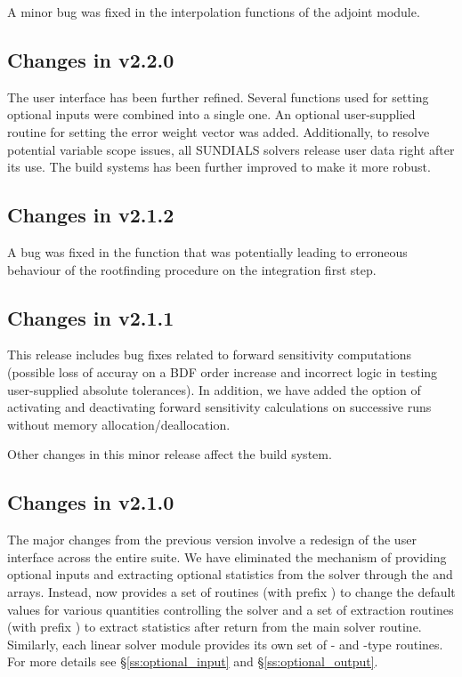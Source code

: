 A minor bug was fixed in the interpolation functions of the adjoint
{\cvodes} module.

\subsection*{Changes in v2.2.0}

The user interface has been further refined. Several functions used
for setting optional inputs were combined into a single one.  An optional
user-supplied routine for setting the error weight vector was added.
Additionally, to resolve potential variable scope issues, all
SUNDIALS solvers release user data right after its use. The build
systems has been further improved to make it more robust.

\subsection*{Changes in v2.1.2}

A bug was fixed in the  function that was potentially
leading to erroneous behaviour of the rootfinding procedure on the 
integration first step.

\subsection*{Changes in v2.1.1}

This {\cvodes} release includes bug fixes related to forward sensitivity
computations (possible loss of accuray on a BDF order increase and incorrect
logic in testing user-supplied absolute tolerances). 
In addition, we have added the option of activating and deactivating
forward sensitivity calculations on successive {\cvodes} runs without memory
allocation/deallocation.

Other changes in this minor {\sundials} release affect the build system.

\subsection*{Changes in v2.1.0}

The major changes from the previous version involve a redesign of the
user interface across the entire {\sundials} suite. We have eliminated the
mechanism of providing optional inputs and extracting optional statistics 
from the solver through the  and  arrays. Instead,
{\cvodes} now provides a set of routines (with prefix )
to change the default values for various quantities controlling the
solver and a set of extraction routines (with prefix )
to extract statistics after return from the main solver routine.
Similarly, each linear solver module provides its own set of {-}
and {-type} routines. For more details see \S\ref{ss:optional_input}
and \S\ref{ss:optional_output}.

